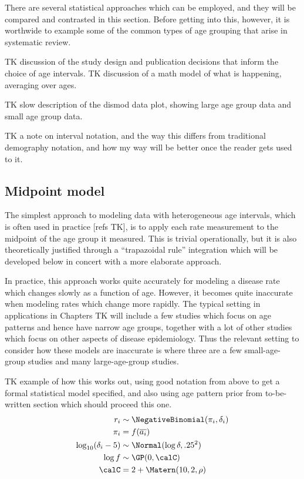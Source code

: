 There are several statistical approaches which can be employed, and
they will be compared and contrasted in this section.  Before getting
into this, however, it is worthwide to example some of the common
types of age grouping that arise in systematic review.

TK discussion of the study design and publication decisions that
inform the choice of age intervals.  TK discussion of a math model of
what is happening, averaging over ages.

TK slow description of the dismod data plot, showing large age group
data and small age group data.

TK a note on interval notation, and the way this differs from
traditional demography notation, and how my way will be better once
the reader gets used to it.

\subsection{Midpoint model}
The simplest approach to modeling data with heterogeneous age
intervals, which is often used in practice [refs TK], is to apply each
rate measurement to the midpoint of the age group it measured.  This
is trivial operationally, but it is also theoretically justified
through a ``trapazoidal rule'' integration which will be developed
below in concert with a more elaborate approach.

In practice, this approach works quite accurately for modeling a
disease rate which changes slowly as a function of age.  However, it
becomes quite inaccurate when modeling rates which change more
rapidly.  The typical setting in applications in Chapters TK
will include a few studies which focus on age patterns and hence have
narrow age groups, together with a lot of other studies which focus on
other aspects of disease epidemiology.  Thus the relevant setting to
consider how these models are inaccurate is where three are a few
small-age-group studies and many large-age-group studies.

TK example of how this works out, using good notation from above to
get a formal statistical model specified, and also using age pattern
prior from to-be-written section which should proceed this one.
\begin{align*}
r_i &\sim \NegativeBinomial(\pi_i, \delta_i)\\
\pi_i &= f(\overline{a_i})\\
\log_{10}(\delta_i - 5) &\sim \Normal(\log\delta, .25^2)\\
\log f &\sim \GP(0, \calC)\\
\calC &= 2 + \Matern(10, 2, \rho)
\end{align*}

